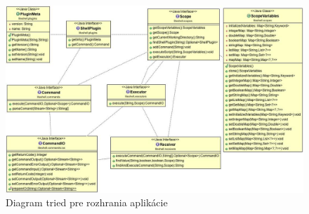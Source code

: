 \begin{figure}[!htbp]
	\centering
	\includegraphics[width=\linewidth]{img/allinterfaces.jpg}
	\caption{Diagram tried pre rozhrania aplikácie}
	\label{fig:test}
\end{figure}
